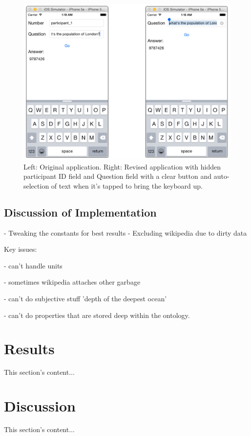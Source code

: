 \documentclass[authoryearcitations]{UoYCSproject}
\begin{document}
\begin{figure}[htb]
    \centering
    \includegraphics[width=\linewidth]{population}
    \caption{Left: Original application. Right: Revised application with hidden participant ID field and Question field with a clear button and auto-selection of text when it's tapped to bring the keyboard up.}
    \label{fig:experimentClientPopulation}
\end{figure}

\section{Discussion of Implementation}
 - Tweaking the constants for best results
 - Excluding wikipedia due to dirty data
 
Key issues:

 - can't handle units
 
 - sometimes wikipedia attaches other garbage
 
 - can't do subjective stuff 'depth of the deepest ocean'
 
 - can't do properties that are stored deep within the ontology.

\newpage
\chapter{Results}
\label{sec:results}
This section's content...

\newpage
\chapter{Discussion}
\label{sec:discussion}
This section's content...
\end{document}

